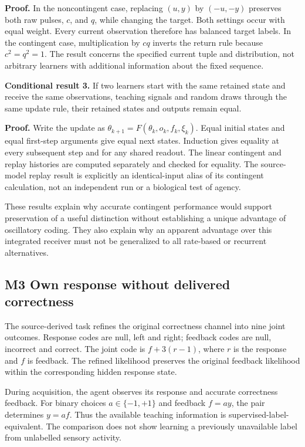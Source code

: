 \documentclass[
  american,
  11pt,
  letterpaper,
]{article}
\begin{document}
\textbf{Proof.} In the noncontingent case, replacing \((u,y)\) by \((-u,-y)\) preserves both raw pulses, \(c\), and \(q\), while changing the target. Both settings occur with equal weight. Every current observation therefore has balanced target labels. In the contingent case, multiplication by \(cq\) inverts the return rule because \(c^2=q^2=1\). The result concerns the specified current tuple and distribution, not arbitrary learners with additional information about the fixed sequence.

\textbf{Conditional result 3.} If two learners start with the same retained state and receive the same observations, teaching signals and random draws through the same update rule, their retained states and outputs remain equal.

\textbf{Proof.} Write the update as \(\theta_{k+1}=F(\theta_k,o_k,f_k,\xi_k)\). Equal initial states and equal first-step arguments give equal next states. Induction gives equality at every subsequent step and for any shared readout. The linear contingent and replay histories are computed separately and checked for equality. The source-model replay result is explicitly an identical-input alias of its contingent calculation, not an independent run or a biological test of agency.

These results explain why accurate contingent performance would support preservation of a useful distinction without establishing a unique advantage of oscillatory coding. They also explain why an apparent advantage over this integrated receiver must not be generalized to all rate-based or recurrent alternatives.

\subsection{M3 Own response without delivered correctness}\label{m3-own-response-without-delivered-correctness}

The source-derived task refines the original correctness channel into nine joint outcomes. Response codes are null, left and right; feedback codes are null, incorrect and correct. The joint code is \(f+3(r-1)\), where \(r\) is the response and \(f\) is feedback. The refined likelihood preserves the original feedback likelihood within the corresponding hidden response state.

During acquisition, the agent observes its response and accurate correctness feedback. For binary choices \(a\in\{-1,+1\}\) and feedback \(f=ay\), the pair determines \(y=af\). Thus the available teaching information is supervised-label-equivalent. The comparison does not show learning a previously unavailable label from unlabelled sensory activity.
\end{document}
